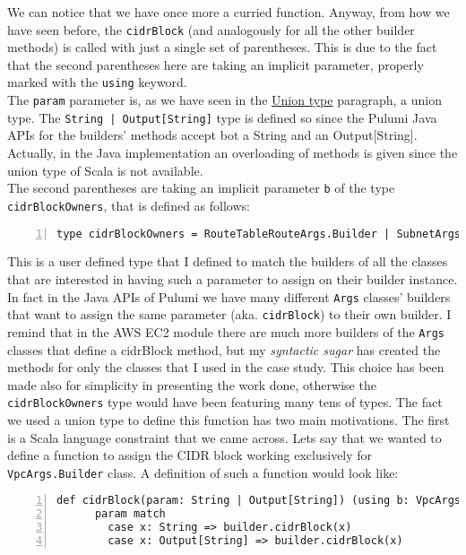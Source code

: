 We can notice that we have once more a curried function.
Anyway, from how we have seen before, the \texttt{cidrBlock} (and analogously for all the other builder methods) is called with just a single set of parentheses.
This is due to the fact that the second parentheses here are taking an implicit parameter, properly marked with the \texttt{using} keyword.\\
The \texttt{param} parameter is, as we have seen in the \hyperref[sssec:union]{Union type} paragraph, a union type.
The \texttt{String | Output[String]} type is defined so since the Pulumi Java APIs for the builders' methods accept bot a String and an Output[String].
Actually, in the Java implementation an overloading of methods is given since the union type of Scala is not available.\\
The second parentheses are taking an implicit parameter \texttt{b} of the type \texttt{cidrBlockOwners}, that is defined as follows:\\
\begin{minipage}{\linewidth}
\begin{lstlisting}[numbers=left, numberstyle=\tiny, numbersep=-5pt, stepnumber=1, linewidth=420pt]
  type cidrBlockOwners = RouteTableRouteArgs.Builder | SubnetArgs.Builder | VpcArgs.Builder
\end{lstlisting}
\end{minipage}
This is a user defined type that I defined to match the builders of all the  classes that are interested in having such a parameter to assign on their builder instance.
In fact in the Java APIs of Pulumi we have many different \texttt{Args} classes' builders that want to assign the same parameter (aka. \texttt{cidrBlock}) to their own builder.
I remind that in the AWS EC2 module there are much more builders of the \texttt{Args} classes that define a cidrBlock method, but my \textit{syntactic sugar} has created the methods for only the classes that I used in the case study.
This choice has been made also for simplicity in presenting the work done, otherwise the \texttt{cidrBlockOwners} type would have been featuring many tens of types.
The fact we used a union type to define this function has two main motivations.
The first is a Scala language constraint that we came across.
Lets say that we wanted to define a function to assign the CIDR block working exclusively for \texttt{VpcArgs.Builder} class.
A definition of such a function would look like:\\
\begin{minipage}{\linewidth}
\begin{lstlisting}[numbers=left, numberstyle=\tiny, numbersep=-5pt, stepnumber=1, linewidth=420pt]
  def cidrBlock(param: String | Output[String]) (using b: VpcArgs.Builder): Unit =
      param match
        case x: String => builder.cidrBlock(x)
        case x: Output[String] => builder.cidrBlock(x)
\end{lstlisting}
\end{minipage}
